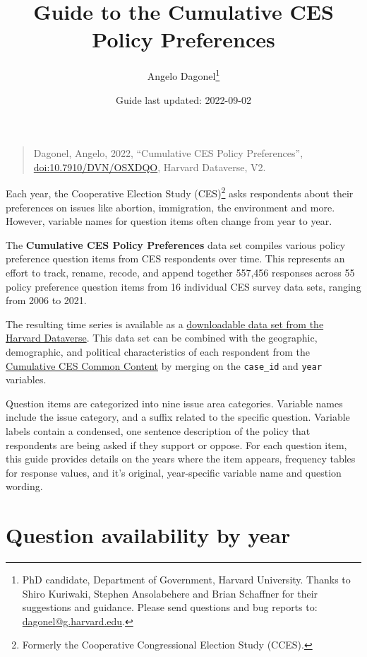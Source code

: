 \documentclass[
  12pt]{article}
\title{\Large Guide to the Cumulative CES Policy Preferences}
\author{Angelo Dagonel\footnote{PhD candidate, Department of Government,
  Harvard University. Thanks to Shiro Kuriwaki, Stephen Ansolabehere and
  Brian Schaffner for their suggestions and guidance. Please send
  questions and bug reports to: \url{dagonel@g.harvard.edu}.}}
\date{Guide last updated: 2022-09-02}
\begin{document}
\maketitle

\begin{quote}
Dagonel, Angelo, 2022, ``Cumulative CES Policy Preferences'',
\href{https://dataverse.harvard.edu/dataset.xhtml?persistentId=doi:10.7910/DVN/OSXDQO}{\url{doi:10.7910/DVN/OSXDQO}},
Harvard Dataverse, V2.
\end{quote}

\bigskip

Each year, the Cooperative Election Study (CES)\footnote{Formerly the
  Cooperative Congressional Election Study (CCES).} asks respondents
about their preferences on issues like abortion, immigration, the
environment and more. However, variable names for question items often
change from year to year.

\medskip

The \textbf{Cumulative CES Policy Preferences} data set compiles various
policy preference question items from CES respondents over time. This
represents an effort to track, rename, recode, and append together
557,456 responses across 55 policy preference question items from 16
individual CES survey data sets, ranging from 2006 to 2021.

\medskip

The resulting time series is available as a
\href{https://dataverse.harvard.edu/dataset.xhtml?persistentId=doi:10.7910/DVN/OSXDQO}{downloadable
data set from the Harvard Dataverse}. This data set can be combined with
the geographic, demographic, and political characteristics of each
respondent from the
\href{https://dataverse.harvard.edu/dataset.xhtml?persistentId=doi:10.7910/DVN/II2DB6}{Cumulative
CES Common Content} by merging on the \texttt{case\_id} and
\texttt{year} variables.

\medskip

Question items are categorized into nine issue area categories. Variable
names include the issue category, and a suffix related to the specific
question. Variable labels contain a condensed, one sentence description
of the policy that respondents are being asked if they support or
oppose. For each question item, this guide provides details on the years
where the item appears, frequency tables for response values, and it's
original, year-specific variable name and question wording.

\newpage

\hypertarget{question-availability-by-year}{%
\section{Question availability by
year}\label{question-availability-by-year}}
\end{document}
